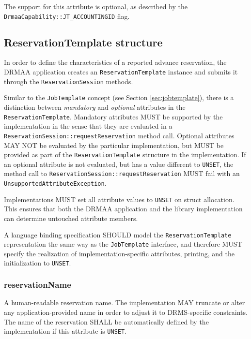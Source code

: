 \documentclass{article}
\newcommand{\h}[1]{\lstinline|#1|}
\newcommand{\langbind}[1]{\begin{shaded}#1\end{shaded}}
\begin{document}
The support for this attribute is optional, as described by the \h{DrmaaCapability::JT_ACCOUNTINGID} flag.

\subsection{ReservationTemplate structure}
\label{sec:reservationtemplate}

In order to define the characteristics of a reported advance reservation, the DRMAA application creates an \h{ReservationTemplate} instance and submits it through the \h{ReservationSession} methods. 



Similar to the \h{JobTemplate} concept (see Section \ref{sec:jobtemplate}), there is a distinction between \emph{mandatory} and \emph{optional} attributes in the \h{ReservationTemplate}. Mandatory attributes MUST be supported by the implementation in the sense that they are evaluated in a \h{ReservationSession::requestReservation} method call. Optional attributes MAY NOT be evaluated by the particular implementation, but MUST be provided as part of the \h{ReservationTemplate} structure in the implementation. If an optional attribute is not evaluated, but has a value different to \h{UNSET}, the method call to \h{ReservationSession::requestReservation} MUST fail with an \h{UnsupportedAttributeException}. 

Implementations MUST set all attribute values to \h{UNSET} on struct allocation. This ensures that both the DRMAA application and the library implementation can determine untouched attribute members.

\langbind{
A language binding specification SHOULD model the \h{ReservationTemplate} representation the same way as the \h{JobTemplate} interface, and therefore MUST specify the realization of implementation-specific attributes, printing, and the initialization to \h{UNSET}.
}

\subsubsection{reservationName}

A human-readable reservation name. The implementation MAY truncate or alter any application-provided name in order to adjust it to  DRMS-specific constraints. The name of the reservation SHALL be automatically defined by the implementation if this attribute is \h{UNSET}.
\end{document}

